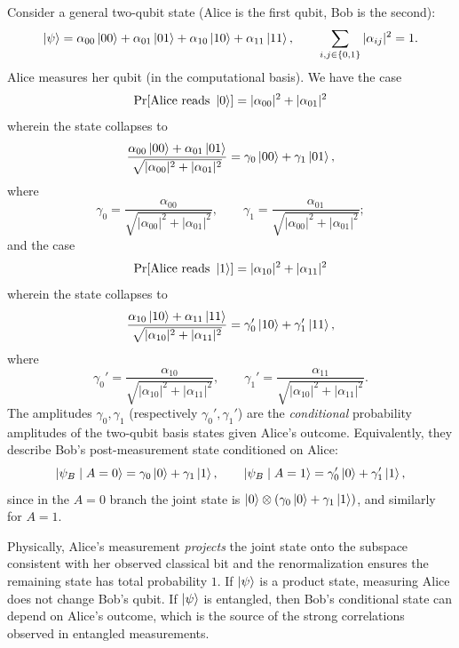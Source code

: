 Consider a general two-qubit state (Alice is the first qubit, Bob is the second):
\[
    \ket{\psi}
    = \alpha_{00}\ket{00}+\alpha_{01}\ket{01}+\alpha_{10}\ket{10}+\alpha_{11}\ket{11},
    \qquad
    \sum_{i,j\in\{0,1\}}|\alpha_{ij}|^2=1.
\]
Alice measures her qubit (in the computational basis). We have the case
\[
    \Pr[\text{Alice reads }\ket{0}] = |\alpha_{00}|^2 + |\alpha_{01}|^2
\]
wherein the state collapses to
\[
    \frac{\alpha_{00}\ket{00}+\alpha_{01}\ket{01}}{\sqrt{|\alpha_{00}|^2+|\alpha_{01}|^2}}
    = \gamma_0\ket{00}+\gamma_1\ket{01},
\]
where
\[
    \gamma_0=\frac{\alpha_{00}}{\sqrt{|\alpha_{00}|^2+|\alpha_{01}|^2}},
    \qquad
    \gamma_1=\frac{\alpha_{01}}{\sqrt{|\alpha_{00}|^2+|\alpha_{01}|^2}};
\]
and the case
\[
    \Pr[\text{Alice reads }\ket{1}] = |\alpha_{10}|^2 + |\alpha_{11}|^2
\]
wherein the state collapses to
\[
    \frac{\alpha_{10}\ket{10}+\alpha_{11}\ket{11}}{\sqrt{|\alpha_{10}|^2+|\alpha_{11}|^2}}
    = \gamma_0'\ket{10}+\gamma_1'\ket{11},
\]
where
\[
    \gamma_0'=\frac{\alpha_{10}}{\sqrt{|\alpha_{10}|^2+|\alpha_{11}|^2}},
    \qquad
    \gamma_1'=\frac{\alpha_{11}}{\sqrt{|\alpha_{10}|^2+|\alpha_{11}|^2}}.
\]
The amplitudes $\gamma_0,\gamma_1$ (respectively $\gamma_0',\gamma_1'$) are the \emph{conditional} probability amplitudes of the two-qubit basis states given Alice's outcome. Equivalently, they describe Bob's post-measurement state conditioned on Alice:
\[
    \ket{\psi_B \mid A=0}=\gamma_0\ket{0}+\gamma_1\ket{1},
    \qquad
    \ket{\psi_B \mid A=1}=\gamma_0'\ket{0}+\gamma_1'\ket{1},
\]
since in the $A=0$ branch the joint state is $\ket{0}\otimes(\gamma_0\ket{0}+\gamma_1\ket{1})$, and similarly for $A=1$.

Physically, Alice's measurement \emph{projects} the joint state onto the subspace consistent with her observed classical bit and the renormalization ensures the remaining state has total probability $1$. If $\ket{\psi}$ is a product state, measuring Alice does not change Bob's qubit. If $\ket{\psi}$ is entangled, then Bob's conditional state can depend on Alice's outcome, which is the source of the strong correlations observed in entangled measurements.

